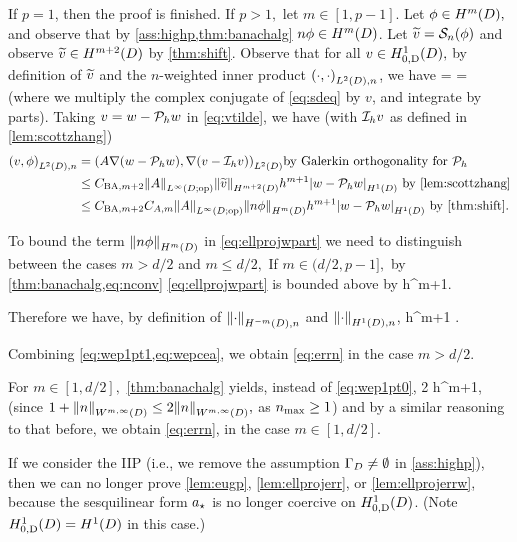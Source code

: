 If $p=1$, then the proof is finished. If $p > 1,$ let $m \in [1,p-1]$. Let $\phi \in \HmD,$ and observe that by \cref{ass:highp,thm:banachalg} $n\phi\in \HmD$. Let $ \widetilde{v} = \mathcal S_{n}(\phi)$ and observe $\vtilde \in \Hfn{}{m+2}{D}$ by \cref{thm:shift}. Observe that for all $v \in \HozDD,$ by definition of $\widetilde{v}$ and the $n$-weighted inner product $\IPLtDn{\cdot}{\cdot}$, we have 
\beq\label{eq:vtilde}
 =  = 
\eeq
(where we multiply the complex conjugate of \cref{eq:sdeq} by $v$, and integrate by parts).
Taking $v = w-\mathcal P_{h} w$ in \cref{eq:vtilde}, we have (with $\mathcal I_{h} v$ as defined in \cref{lem:scottzhang})
\begin{align}
\IPLtDn{v}{\phi} &= \IPLtD{A\grad\mleft(w-\Ph w\mright)}{\grad\mleft(v - \Ih v\mright)} \text{by Galerkin orthogonality for } \Ph\nonumber\\
&\leq \CSZfn{m+2}\NLiDop{A} \NHfn{m+2}{D}{\vtilde} h^{m+1} \SNHoD{w-\Ph w} \text{ by \cref{lem:scottzhang}}\nonumber\\
&\leq \CSZfn{m+2} \CAfn{m} \NLiDop{A} \NHfn{m}{D}{n\phi} h^{m+1}\SNHoD{w-\Ph w}\text{ by \cref{thm:shift}.}\label{eq:ellprojwpart}
\end{align}

To bound the term $\NHfn{m}{D}{n\phi}$ in \cref{eq:ellprojwpart} we need to distinguish between the cases $m > d/2$ and $m \leq d/2,$ If $m \in (d/2,p-1],$ by \cref{thm:banachalg,eq:nconv} \cref{eq:ellprojwpart} is bounded above by
\beq\label{eq:wep1pt0}
     h^{m+1}.
\eeq

Therefore we have, by definition of $\NHnfn{-m}{D}{\cdot}$ and $\NHoDn{\cdot}$,
\beq\label{eq:wep1pt1}
 \leq {}    h^{m+1} .
\eeq

Combining \cref{eq:wep1pt1,eq:wepcea}, we obtain \cref{eq:errn} in the case $m > d/2$.

For $m \in [1,d/2],$ \cref{thm:banachalg} yields, instead of \cref{eq:wep1pt0},
\beq\label{eq:wep2pt1}
2     h^{m+1},
\eeq
(since $1 + \NWmiD{n} \leq 2\NWmiD{n},$ as $n_{\max} \geq 1$) and by a similar reasoning to that before, we obtain \cref{eq:errn}, in the case $m \in [1,d/2]$.
\epf

\label{rem:epdef}
If we consider the IIP (i.e., we remove the assumption $\Gamma_{D} \neq \emptyset$ in \cref{ass:highp}), then we can no longer prove  \ref{lem:eugp}, \ref{lem:ellprojerr}, or \ref{lem:ellprojerrw}, because the sesquilinear form $a_{\star}$ is no longer coercive on $\HozDD$. (Note $\HozDD = \HoD$ in this case.)

